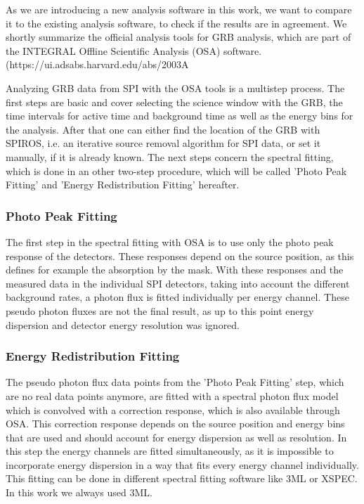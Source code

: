 \documentclass[twocolumn]{aa}
\begin{document}
As we are introducing a new analysis software in this work, we want to compare it to the existing analysis software, to check if the results are in agreement. We shortly summarize the official analysis tools for GRB analysis, which are part of the INTEGRAL Offline Scientific Analysis (OSA) software. (https://ui.adsabs.harvard.edu/abs/2003A%

Analyzing GRB data from SPI with the OSA tools is a multistep process. The first steps are basic and cover selecting the science window with the GRB, the time intervals for active time and background time as well as the energy bins for the analysis. After that one can either find the location of the GRB with SPIROS, i.e. an iterative source removal algorithm for SPI data, or set it manually, if it is already known. The next steps concern the spectral fitting, which is done in an other two-step procedure, which will be called 'Photo Peak Fitting' and 'Energy Redistribution Fitting' hereafter.

\subsubsection*{Photo Peak Fitting}

The first step in the spectral fitting with OSA is to use only the photo peak response of the detectors. These responses depend on the source position, as this defines for example the absorption by the mask. With these responses and the measured data in the individual SPI detectors, taking into account the different background rates, a photon flux is fitted individually per energy channel. These pseudo photon fluxes are not the final result, as up to this point energy dispersion and detector energy resolution was ignored.

\subsubsection*{Energy Redistribution Fitting}

The pseudo photon flux data points from the 'Photo Peak Fitting' step, which are no real data points anymore, are fitted with a spectral photon flux model which is convolved with a correction response, which is also available through OSA. This correction response depends on the source position and energy bins that are used and should account for energy dispersion as well as resolution. In this step the energy channels are fitted simultaneously, as it is impossible to incorporate energy dispersion in a way that fits every energy channel individually. This fitting can be done in different spectral fitting software like 3ML or XSPEC. In this work we always used 3ML.
\end{document}
